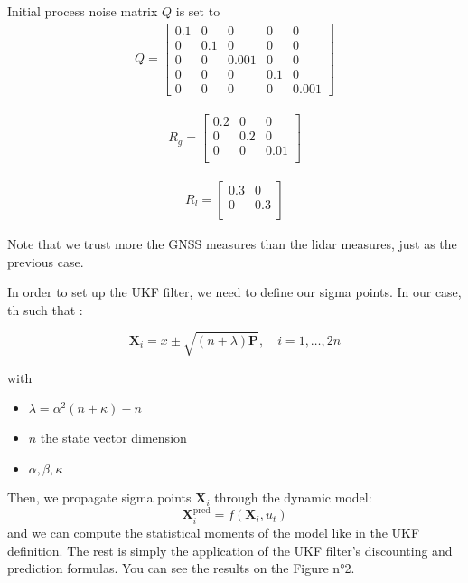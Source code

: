 \documentclass[conference]{IEEEtran}
\begin{document}
\noindent Initial process noise matrix $Q$ is set to
\begin{align*}
   Q = \begin{bmatrix}
    0.1 & 0 & 0 & 0 & 0 \\ 
    0 & 0.1 & 0 & 0 & 0 \\
    0 & 0 & 0.001 & 0 & 0 \\
    0 & 0 & 0 & 0.1 & 0 \\
    0 & 0 & 0 & 0 & 0.001
    \end{bmatrix}
\end{align*}

\begin{align*}
   R_g = \begin{bmatrix}
    0.2 & 0 & 0 \\ 
    0 & 0.2 & 0 \\
    0 & 0 & 0.01  \\
    \end{bmatrix}
\end{align*}


\begin{align*}
   R_l = \begin{bmatrix}
    0.3 & 0 \\ 
    0 & 0.3 \\
    \end{bmatrix}
\end{align*}

\noindent Note that we trust more the GNSS measures than the lidar measures, just as the previous case.

\vspace{2mm}

\noindent In order to set up the UKF filter, we need to define our sigma points. In our case, th such that : 

 \[
    \mathbf{X}_i = x \pm \sqrt{(n + \lambda)\mathbf{P}}, \quad i = 1, \dots, 2n
 \]

with 
\begin{itemize}
    \item $\lambda = \alpha^2(n + \kappa) - n$
    \item $n$ the state vector dimension
    \item $\alpha, \beta, \kappa$ 
\end{itemize}

\vspace{2mm}

\noindent Then, we propagate sigma points $\mathbf{X}_i$ through the dynamic model:
    \[
    \mathbf{X}_i^{\text{pred}} = f(\mathbf{X}_i, u_t)
    \]
\noindent and we can compute the statistical moments of the model like in the UKF definition. The rest is simply the application of the UKF filter's discounting and prediction formulas. You can see the results on the Figure n°2.
\end{document}
